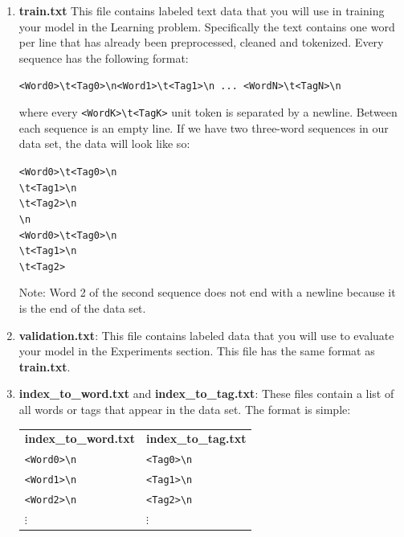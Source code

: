 \documentclass[11pt,addpoints,answers]{exam}
\begin{document}
\begin{enumerate}

\item \textbf{train.txt} This file contains labeled text data that you will use in training your model in the Learning problem. Specifically the text contains one word per line that has already been preprocessed, cleaned and tokenized. Every sequence has the following format:

    \texttt{<Word0>\textbackslash t<Tag0>\textbackslash n<Word1>\textbackslash t<Tag1>\textbackslash n ... <WordN>\textbackslash t<TagN>\textbackslash n}

where every \texttt{<WordK>\textbackslash t<TagK>} unit token is separated by a newline. Between each sequence is an empty line. If we have two three-word sequences in our data set, the data will look like so:

    \texttt{<Word0>\textbackslash t<Tag0>\textbackslash n\\<Word1>\textbackslash t<Tag1>\textbackslash n\\<Word2>\textbackslash t<Tag2>\textbackslash n\\\textbackslash n\\}
    \texttt{<Word0>\textbackslash t<Tag0>\textbackslash n\\<Word1>\textbackslash t<Tag1>\textbackslash n\\<Word2>\textbackslash t<Tag2>}
    
Note: Word 2 of the second sequence does not end with a newline because it is the end of the data set.

\item \textbf{validation.txt}: This file contains labeled data that you will use to evaluate your model in the Experiments section. This file has the same format as \textbf{train.txt}.
    
\item \textbf{index\_to\_word.txt} and \textbf{index\_to\_tag.txt}: These files contain a list of all words or tags that appear in the data set. The format is simple:

\begin{tabular}{ m{5cm}  m{5cm} } 
    \textbf{index\_to\_word.txt} & \textbf{index\_to\_tag.txt} \\
    \texttt{<Word0>\textbackslash n} & \texttt{<Tag0>\textbackslash n} \\
    \texttt{<Word1>\textbackslash n} & \texttt{<Tag1>\textbackslash n} \\
    \texttt{<Word2>\textbackslash n} & \texttt{<Tag2>\textbackslash n} \\
    $\vdots$ & $\vdots$
\end{tabular}


\end{enumerate}
\end{document}
